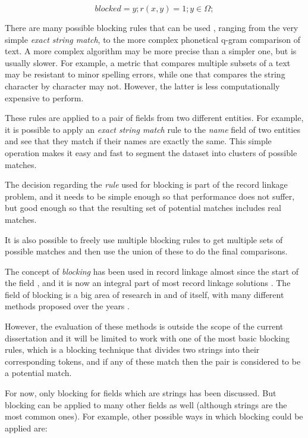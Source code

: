 \documentclass[epsfig,a4paper,11pt,titlepage,twoside,openany]{book}
\begin{document}
$$
blocked = {y; r(x,y) = 1; y \in \Omega;}
$$

There are many possible blocking rules that can be used
\cite{christen12_survey_index_techn_scalab_recor_linkag_dedup}, ranging from the
very simple \textit{exact string match}, to the more complex phonetical q-gram
comparison of text. A more complex algorithm may be more precise than a simpler one, but is usually slower. For example, a metric that compares multiple subsets of a text may be resistant to minor spelling errors, while one that compares the string character by character may not. However, the latter is less computationally expensive to perform.

These rules are applied to a pair of fields from two different entities. For
example, it is possible to apply an \textit{exact string match} rule to the \textit{name}
field of two entities and see that they match if their names are exactly the
same. This simple operation makes it easy and fast to segment the dataset into
clusters of possible matches.

The decision regarding the \textit{rule} used for blocking is part of the record
linkage problem, and it needs to be simple enough so that performance does not suffer, but good enough so that the resulting set of potential
matches includes real matches. 

It is also possible to freely use multiple blocking
rules to get multiple sets of possible matches and then use the union of these
to do the final comparisons.

The concept of \textit{blocking} has been used in record linkage almost since
the start of the field \cite{fellegi69_theor_recor_linkag}, and it is now an integral part of most record linkage solutions \cite{winkler2006overview}. The
field of blocking is a big area of research in and of itself, with many
different methods proposed over the years
\cite{christen12_survey_index_techn_scalab_recor_linkag_dedup, Baxter2003ACO}.

However, the evaluation of these methods is outside the scope of the current
dissertation and it will be limited to work with one of the most basic blocking rules,
which is a blocking technique that divides two strings into their corresponding
tokens, and if any of these match then the pair is considered to be a potential match.

For now, only blocking for fields which are strings has been discussed. But
blocking can be applied to many other fields as well (although strings are the
most common ones). For example, other possible ways in which blocking could be applied are: 
\end{document}

